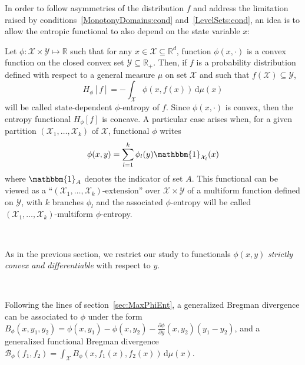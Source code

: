 \documentclass[entropy,article,submit,moreauthors,pdftex]{Definitions/mdpi}
\def\dmu{\mathrm{d}\mu}%
\def\fB{\mathcal{B}}%
\def\Rset{\mathbb{R}}%
\def\X{\mathcal{X}}%
\def\Y{\mathcal{Y}}%
\def\un{\mathbbm{1}}%
\begin{document}
In  order  to  follow  asymmetries  of the  distribution  $f$  and  address  the
limitation        raised         by        conditions~\ref{MonotonyDomains:cond}
and~\ref{LevelSets:cond}, an  idea is to  allow the entropic functional  to also
depend on the state variable $x$:
%
\begin{Definition}
\label{def:asym_phi-entropy}
%
  Let $\phi: \X \times  \Y \mapsto \Rset$ such that for any  $x \in \X \subseteq
  \Rset^d$, function $\phi(x,\cdot)$  is a convex function on  the closed convex
  set  $\Y \subseteq  \Rset_+$.   Then,  if $f$  is  a probability  distribution
  defined with  respect to  a general measure  $\mu$ on set  $\X$ and  such that
  $f(\X) \subseteq \Y$,
  \begin{equation}\label{eq:asym_phi-entropy}
  H_\phi[f] = - \int_\X \phi(x,f(x)) \, \dmu(x)
  \end{equation}
  will be  called state-dependent $\phi$-entropy of  $f$.  Since $\phi(x,\cdot)$
  is convex, then the entropy functional $H_\phi[f]$ is concave.
  A particular case arises when, for  a given partition $(\X_1 , \ldots , \X_k)$
  of $\X$, functional $\phi$ writes
  \begin{equation}\label{eq:multiform_phi-entropy}
  \phi(x,y) = \sum_{l=1}^k \phi_l(y) \un_{\X_l}(x)
  \end{equation}
  where $\un_A$ denotes the indicator of set $A$.  This functional can be viewed
  as a ``$(\X_1 , \ldots , \X_k)$-extension'' over $\X \times \Y$ of a multiform
  function  defined on  $\Y$,  with  $k$ branches  $\phi_l$  and the  associated
  $\phi$-entropy   will   be  called   $(\X_1   ,   \ldots  ,   \X_k)$-multiform
  $\phi$-entropy.
\end{Definition}

\

As in  the previous section,  we restrict  our study to  functionals $\phi(x,y)$
{\em strictly convex and differentiable} with respect to $y$.

\

Following  the  lines  of  section~\ref{sec:MaxPhiEnt},  a  generalized  Bregman
divergence  can be  associated to  $\phi$  under the  form $B_\phi(x,y_1,y_2)  =
\phi(x,y_1) - \phi(x,y_2) - \frac{\partial \phi}{\partial y}(x,y_2) \left( y_1 -
y_2  \right)$, and  a generalized  functional Bregman  divergence $\displaystyle
\fB_\phi(f_1,f_2) = \int_\X B_\phi(x,f_1(x),f_2(x)) \, \dmu(x)$.

\
\end{document}
